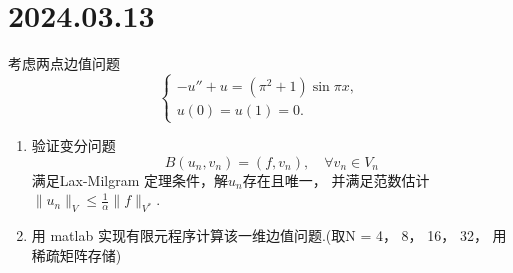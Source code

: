 \documentclass[12pt,a4paper]{article}
\begin{document}
	
	\noindent
	
	\section{2024.03.13}	
	
	
	考虑两点边值问题
	\begin{equation}
		\left\{
		\begin{array}{l}
			-u'' + u = (\pi^2 +1) \sin{\pi x}, \\
			u(0) = u(1) = 0.
		\end{array}
		\right.
	\end{equation}
	
	\begin{enumerate}
		
		\item 验证变分问题 $$B(u_n, v_n) = (f, v_n),\quad \forall v_n \in V_n$$ 满足Lax-Milgram 定理条件，解$u_n$存在且唯一， 并满足范数估计 $\|u_n\|_V \leq \frac{1}{\alpha} \|f\|_{V^*} $.
		
		\item 用 matlab 实现有限元程序计算该一维边值问题.(取N = 4， 8， 16， 32， 用稀疏矩阵存储)
		
		
	\end{enumerate}
	
	
\end{document}
